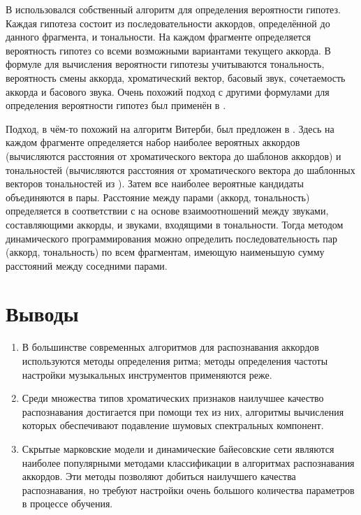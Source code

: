 В \cite{Yoshioka2004} использовался собственный алгоритм для определения
вероятности гипотез. Каждая гипотеза состоит из последовательности аккордов,
определённой до данного фрагмента, и тональности. На каждом фрагменте
определяется вероятность гипотез со всеми возможными вариантами текущего
аккорда. В формуле для вычисления вероятности гипотезы учитываются тональность,
вероятность смены аккорда, хроматический вектор, басовый звук, сочетаемость
аккорда и басового звука. Очень похожий подход с другими формулами для
определения вероятности гипотез был применён в \cite{Sumi2008}.

Подход, в чём-то похожий на алгоритм Витерби, был предложен в \cite{Rocher2010}.
Здесь на каждом фрагменте определяется набор наиболее вероятных аккордов
(вычисляются расстояния от хроматического вектора до шаблонов аккордов) и
тональностей (вычисляются расстояния от хроматического вектора до шаблонных
векторов тональностей из \cite{Temperley2001}). Затем все наиболее вероятные
кандидаты объединяются в пары. Расстояние между парами (аккорд, тональность)
определяется в соответствии с \cite{Lerdahl2001} на основе взаимоотношений
между звуками, составляющими аккорды, и звуками, входящими в тональности. Тогда
методом динамического программирования можно определить последовательность пар
(аккорд, тональность) по всем фрагментам, имеющую наименьшую сумму расстояний
между соседними парами.

% 

\section{Выводы}

\begin{enumerate}
  \item В большинстве современных алгоритмов для распознавания аккордов
  используются методы определения ритма; методы определения частоты настройки
  музыкальных инструментов применяются реже.
  \item Среди множества типов хроматических признаков наилучшее качество
  распознавания достигается при помощи тех из них, алгоритмы вычисления которых
  обеспечивают подавление шумовых спектральных компонент.
  \item Скрытые марковские модели и динамические байесовские сети являются
  наиболее популярными методами классификации в алгоритмах распознавания
  аккордов. Эти методы позволяют добиться наилучшего качества распознавания, но
  требуют настройки очень большого количества параметров в процессе обучения.
\end{enumerate}

\clearpage
